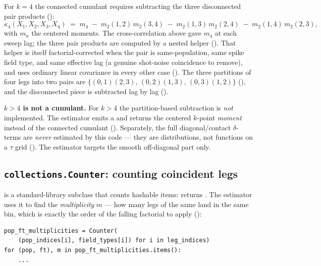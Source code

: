 For $k=4$ the connected cumulant requires subtracting the three disconnected pair
products ():
\begin{equation}
  \kappa_4(X_1,X_2,X_3,X_4)
  \;=\; m_4
       \;-\; m_2(1,2)\,m_2(3,4)
       \;-\; m_2(1,3)\,m_2(2,4)
       \;-\; m_2(1,4)\,m_2(2,3),
  \label{eq:kappa4}
\end{equation}
with $m_n$ the centered moments. The cross-correlation above gave $m_4$ at each
sweep lag; the three pair products are computed by a nested helper
(). That helper is itself
factorial-corrected when the pair is same-population, same spike field type, and
same effective lag (a genuine shot-noise coincidence to remove), and uses ordinary
linear covariance in every other case ().
The three partitions of four legs into two pairs are
$\{(0,1)(2,3),\,(0,2)(1,3),\,(0,3)(1,2)\}$
(), and the disconnected piece is subtracted
lag by lag ().

\begin{gotcha}
\textbf{$k>4$ is not a cumulant.} For $k>4$ the partition-based subtraction is
\emph{not} implemented. The estimator emits a  and returns the
centered $k$-point \emph{moment} instead of the connected cumulant
(). Separately, the full diagonal/contact
$\delta$-terms are \emph{never} estimated by this code --- they are distributions,
not functions on a $\tau$ grid (). The
estimator targets the smooth off-diagonal part only.
\end{gotcha}

\subsection{\texttt{collections.Counter}: counting coincident legs}
\label{sec:counter}

 is a standard-library  subclass that counts
hashable items:  returns .
The estimator uses it to find the \emph{multiplicity} $m$ --- how many legs of the
same  land in the same bin, which is exactly the
order of the falling factorial to apply ():

\begin{lstlisting}
pop_ft_multiplicities = Counter(
    (pop_indices[i], field_types[i]) for i in leg_indices)
for (pop, ft), m in pop_ft_multiplicities.items():
    ...
\end{lstlisting}

